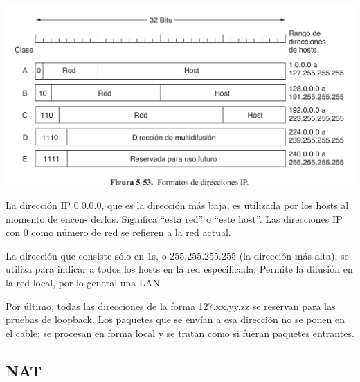 \documentclass[10pt,a4paper]{report}
\begin{document}
	\begin{center}
		\includegraphics[scale=0.3]{./imagenes/clasesIP.png} 
	\end{center}	
	La dirección IP 0.0.0.0, que es la dirección más baja, es utilizada por los hosts al momento de encen-
derlos. Significa “esta red” o “este host”. Las direcciones IP con 0 como número de red se refieren a la
red actual.
	\par La dirección que
consiste sólo en 1s, o 255.255.255.255 (la dirección más alta), se utiliza para indicar a todos los hosts
en la red especificada. Permite la difusión en la red local, por lo general una LAN.
	\par Por último, todas
las direcciones de la forma 127.xx.yy.zz se reservan para las pruebas de loopback. Los paquetes que se
envían a esa dirección no se ponen en el cable; se procesan en forma local y se tratan como si fueran
paquetes entrantes.
	\subsection{NAT}
	
\end{document}
